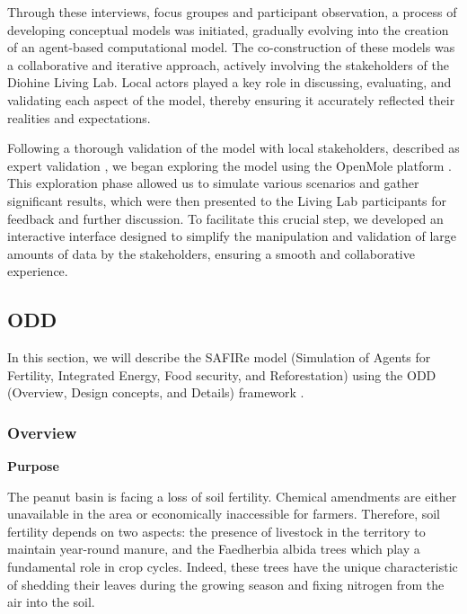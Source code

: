 \documentclass{article}
\begin{document}
Through these interviews, focus groupes and participant observation, a process of developing conceptual models was initiated, gradually evolving into the creation of an agent-based computational model. The co-construction of these models was a collaborative and iterative approach, actively involving the stakeholders of the Diohine Living Lab. Local actors played a key role in discussing, evaluating, and validating each aspect of the model, thereby ensuring it accurately reflected their realities and expectations.

Following a thorough validation of the model with local stakeholders, described as expert validation \parencite{bommel_definition_2009}, we began exploring the model using the OpenMole platform \parencite{reuillon_openmole_2013}. This exploration phase allowed us to simulate various scenarios and gather significant results, which were then presented to the Living Lab participants for feedback and further discussion. To facilitate this crucial step, we developed an interactive interface designed to simplify the manipulation and validation of large amounts of data by the stakeholders, ensuring a smooth and collaborative experience.

\subsection{ODD }

In this section, we will describe the SAFIRe model (Simulation of Agents for Fertility, Integrated Energy, Food security, and Reforestation) using the ODD (Overview, Design concepts, and Details) framework \parencite{grimm_standard_2006,grimm_odd_2010,grimm_odd_2020}.


    \subsubsection{Overview}

        \textbf{Purpose}

        The peanut basin is facing a loss of soil fertility. Chemical amendments are either unavailable in the area or economically inaccessible for farmers. Therefore, soil fertility depends on two aspects: the presence of livestock in the territory to maintain year-round manure, and the Faedherbia albida trees which play a fundamental role in crop cycles. Indeed, these trees have the unique characteristic of shedding their leaves during the growing season and fixing nitrogen from the air into the soil.
\end{document}
